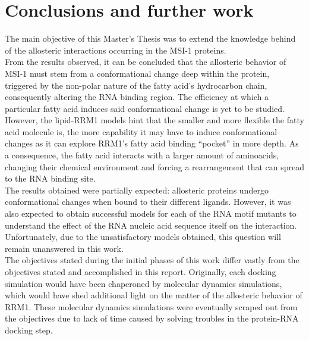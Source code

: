 \section{Conclusions and further work}

The main objective of this Master's Thesis was to extend the knowledge behind of the allosteric interactions occurring in the MSI-1 proteins.\\

From the results observed, it can be concluded that the allosteric behavior of MSI-1 must stem from a conformational change deep within the protein, triggered by the non-polar nature of the fatty acid's hydrocarbon chain, consequently altering the RNA binding region. The efficiency at which a particular fatty acid induces said conformational change is yet to be studied.\\

However, the lipid-RRM1 models hint that the smaller and more flexible the fatty acid molecule is, the more capability it may have to induce conformational changes as it can explore RRM1's fatty acid binding ``pocket'' in more depth. As a consequence, the fatty acid interacts with a larger amount of aminoacids, changing their chemical environment and forcing a rearrangement that can spread to the RNA binding site.\\

The results obtained were partially expected: allosteric proteins undergo conformational changes when bound to their different ligands. However, it was also expected to obtain successful models for each of the RNA motif mutants to understand the effect of the RNA nucleic acid sequence itself on the interaction. Unfortunately, due to the unsatisfactory models obtained, this question will remain unanswered in this work.\\

The objectives stated during the initial phases of this work differ vastly from the objectives stated and accomplished in this report. Originally, each docking simulation would have been chaperoned by molecular dynamics simulations, which would have shed additional light on the matter of the allosteric behavior of RRM1. These molecular dynamics simulations were eventually scraped out from the objectives due to lack of time caused by solving troubles in the protein-RNA docking step.\\

